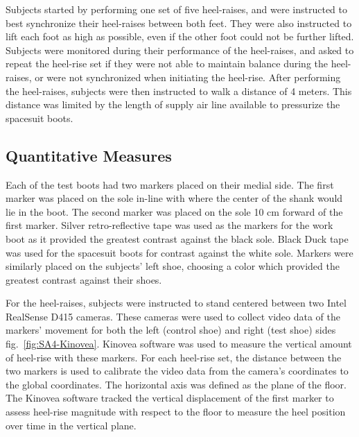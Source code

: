 \documentclass[defaultstyle,11pt]{thesis}
\begin{document}
Subjects started by performing one set of five heel-raises, and were instructed to best synchronize their heel-raises between both feet.
They were also instructed to lift each foot as high as possible, even if the other foot could not be further lifted.
Subjects were monitored during their performance of the heel-raises, and asked to repeat the heel-rise set if they were not able to maintain balance during the heel-raises, or were not synchronized when initiating the heel-rise.
After performing the heel-raises, subjects were then instructed to walk a distance of 4 meters.
This distance was limited by the length of supply air line available to pressurize the spacesuit boots.

\hypertarget{quantitative-measures}{%
\subsection{Quantitative Measures}\label{quantitative-measures}}

Each of the test boots had two markers placed on their medial side.
The first marker was placed on the sole in-line with where the center of the shank would lie in the boot.
The second marker was placed on the sole 10 cm forward of the first marker.
Silver retro-reflective tape was used as the markers for the work boot as it provided the greatest contrast against the black sole.
Black Duck tape was used for the spacesuit boots for contrast against the white sole.
Markers were similarly placed on the subjects' left shoe, choosing a color which provided the greatest contrast against their shoes.

For the heel-raises, subjects were instructed to stand centered between two Intel RealSense D415 cameras.
These cameras were used to collect video data of the markers' movement for both the left (control shoe) and right (test shoe) sides fig.~\ref{fig:SA4-Kinovea}.
Kinovea software was used to measure the vertical amount of heel-rise with these markers.
For each heel-rise set, the distance between the two markers is used to calibrate the video data from the camera's coordinates to the global coordinates.
The horizontal axis was defined as the plane of the floor.
The Kinovea software tracked the vertical displacement of the first marker to assess heel-rise magnitude with respect to the floor to measure the heel position over time in the vertical plane.
\end{document}
